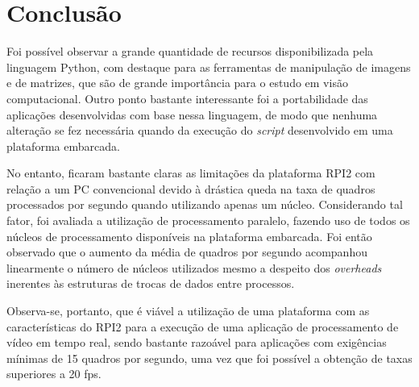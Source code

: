\documentclass[conference]{IEEEtran}
\begin{document}
\section{Conclusão}
Foi possível observar a grande quantidade de recursos disponibilizada pela linguagem Python, com destaque para as ferramentas de manipulação de imagens e de matrizes, que são de grande importância para o estudo em visão computacional. Outro ponto bastante interessante foi a portabilidade das aplicações desenvolvidas com base nessa linguagem, de modo que nenhuma alteração se fez necessária quando da execução do \textit{script} desenvolvido em uma plataforma embarcada.

No entanto, ficaram bastante claras as limitações da plataforma RPI2 com relação a um PC convencional devido à drástica queda na taxa de quadros processados por segundo quando utilizando apenas um núcleo. Considerando tal fator, foi avaliada a utilização de processamento paralelo, fazendo uso de todos os núcleos de processamento disponíveis na plataforma embarcada. Foi então observado que o aumento da média de quadros por segundo acompanhou linearmente o número de núcleos utilizados mesmo a despeito dos \textit{overheads} inerentes às estruturas de trocas de dados entre processos.

Observa-se, portanto, que é viável a utilização de uma plataforma com as características do RPI2 para a execução de uma aplicação de processamento de vídeo em tempo real, sendo bastante razoável para aplicações com exigências mínimas de 15 quadros por segundo, uma vez que foi possível a obtenção de taxas superiores a 20 fps. 












\end{document}
